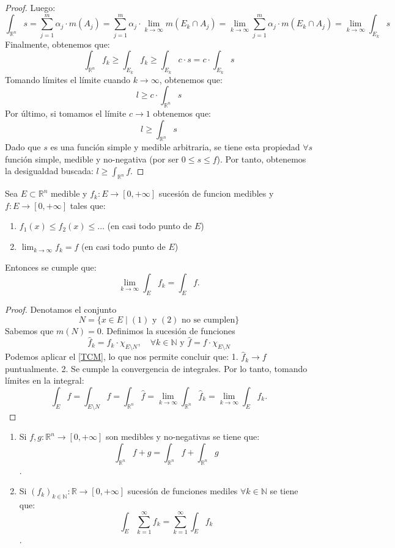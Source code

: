 \begin{proof}
    Luego:$$\int_{\mathbb{R}^n} s = \sum_{j=1}^{m} \alpha_j \cdot m(A_j) =
        \sum_{j=1}^{m} \alpha_j \cdot \lim\limits_{k \to \infty} m(E_k \cap A_j) =
        \lim\limits_{k \to \infty} \sum_{j=1}^{m} \alpha_j \cdot m(E_k \cap A_j) =
        \lim\limits_{k \to \infty} \int_{E_k} s$$ Finalmente, obtenemos que: $$
        \int_{\mathbb{R}^n}f_k \geq \int_{E_k} f_k \geq \int_{E_k} c \cdot s = c \cdot
        \int_{E_k} s$$ Tomando límites el límite cuando $k \to \infty$, obtenemos que:
    $$ l \geq c \cdot \int_{\mathbb{R}^n} s$$ Por último, si tomamos el límite $c
        \to 1$ obtenemos que: $$ l \geq \int_{\mathbb{R}^n} s$$ Dado que $s$ es una
    función simple y medible arbitraria, se tiene esta propiedad $\forall s$
    función simple, medible y no-negativa (por ser $0 \leq s \leq f$). Por tanto,
    obtenemos la desigualdad buscada: $l \geq \int_{\mathbb{R}^n} f$.
\end{proof}
\begin{teorema} 
    Sea $E \subset \mathbb{R}^n$ medible y $f_k: E \to [0, +\infty]$ sucesión de funcion medibles y $f: E \to [0, +\infty]$ tales que:
    \begin{enumerate}
        \item $f_1(x) \leq f_2(x) \leq \dots$ (en casi todo punto de $E$)
        \item $\lim_{k \to \infty}f_k = f$ (en casi todo punto de $E$)
    \end{enumerate}
    Entonces se cumple que: $$\lim_{k \to \infty}\int_{E}f_k = \int_{E}f.$$
\end{teorema}
\begin{proof}
    Denotamos el conjunto $$ N = \{ x \in E \mid (1) \text{ y } (2) \text{ no se cumplen} \} $$
    Sabemos que \( m(N) = 0 \). Definimos la sucesión de funciones $$ \hat{f}_k = f_k \cdot \chi_{E \setminus  N}, \quad \forall k \in \mathbb{N} \text{ y } \hat{f} = f \cdot \chi_{E\setminus N}$$
    Podemos aplicar el \cref{TCM}, lo que nos permite concluir que:
    1. \( \hat{f}_k \to f \) puntualmente.
    2. Se cumple la convergencia de integrales.
    Por lo tanto, tomando límites en la integral:
    $$ \int_E f = \int_{E \setminus N} f = \int_{\mathbb{R}^n}\hat{f} = \lim_{k \to \infty} \int_{\mathbb{R}^n} \hat{f}_k = \lim_{k \to \infty} \int_E f_k. $$
\end{proof}
\begin{corolario}
    \vspace{-2.5em}
    \begin{enumerate}
        \item Si $f, g: \mathbb{R}^n \to [0, +\infty]$ son medibles y no-negativas se tiene
              que: $$\int_{\mathbb{R}^n}f+g = \int_{\mathbb{R}^n}f + \int_{\mathbb{R}^n}g$$.
        \item Si $(f_k)_{k\in \mathbb{N}}: \mathbb{R} \to [0, +\infty]$ sucesión de funciones
              mediles $\forall k \in \mathbb{N}$ se tiene que:
              $$\int_{E}\sum_{k=1}^{\infty}f_k = \sum_{k=1}^{\infty}\int_{E}f_k$$.
    \end{enumerate}
    \label{cor:TCM}
\end{corolario}

